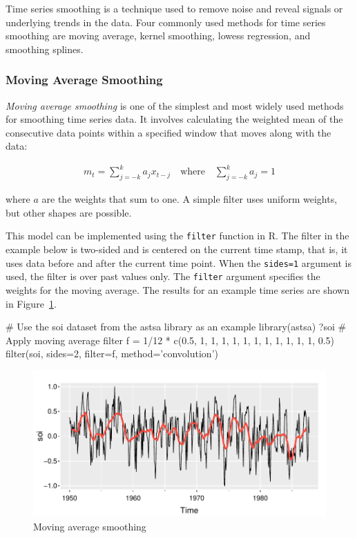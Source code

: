 Time series smoothing is a technique used to remove noise and reveal signals or underlying trends in the data. Four commonly used methods for time series smoothing are moving average, kernel smoothing, lowess regression, and smoothing splines. 

\subsubsection*{Moving Average Smoothing}

\emph{Moving average smoothing} is one of the simplest and most widely used methods for smoothing time series data. It involves calculating the weighted mean of the consecutive data points within a specified window that moves along with the data:

\begin{align*}m_t = \sum_{j=-k}^k a_j x_{t-j} \quad \text{where} \quad
\sum_{j=-k}^k a_j = 1
\end{align*}

\noindent where $a$ are the weights that sum to one. A simple filter uses uniform weights, but other shapes are possible.

This model can be implemented using the \texttt{filter} function in R. The filter in the example below is two-sided and is centered on the current time stamp, that is, it uses data before and after the current time point. When the \texttt{sides=1} argument is used, the filter is over past values only. The \texttt{filter} argument specifies the weights for the moving average. The results for an example time series are shown in Figure~\ref{fig:figure14}.

\begin{samepage}
\begin{Rcode}
# Use the soi dataset from the astsa library as an example
library(astsa)
?soi
# Apply moving average filter
f = 1/12 * c(0.5, 1, 1, 1, 1, 1, 1, 1, 1, 1, 1, 1, 0.5)
filter(soi, sides=2, filter=f, method='convolution')
\end{Rcode}
\end{samepage}

\begin{figure}
\centering
\includegraphics[width=.75\textwidth]{figure14.pdf}
\caption{Moving average smoothing}
\label{fig:figure14}
\end{figure}

